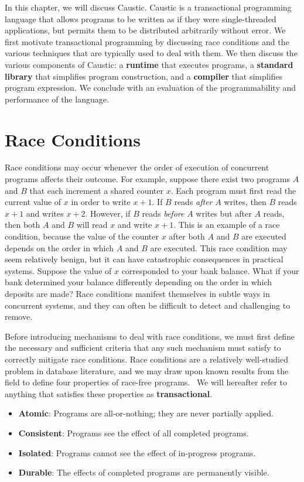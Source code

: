 \documentclass[../main.tex]{subfiles}
\begin{document}
In this chapter, we will discuss Caustic. Caustic is a transactional programming language that
allows programs to be written as if they were single-threaded applications, but permits them to be
distributed arbitrarily without error. We first motivate transactional programming by
discussing race conditions and the various techniques that are typically used to deal with them. We
then discuss the various components of Caustic: a \textbf{runtime} that executes programs, a
\textbf{standard library} that simplifies program construction, and a \textbf{compiler} that
simplifies program expression. We conclude with an evaluation of the programmability and
performance of the language.

\section{Race Conditions}
Race conditions may occur whenever the order of execution of concurrent programs affects their
outcome. For example, suppose there exist two programs $A$ and $B$ that each increment a shared
counter $x$. Each program must first read the current value of $x$ in order to write $x + 1$. If
$B$ reads \emph{after} $A$ writes, then $B$ reads $x + 1$ and writes $x + 2$. However, if $B$ reads
\emph{before} $A$ writes but after $A$ reads, then both $A$ and $B$ will read $x$ and write $x + 1$.
This is an example of a race condition, because the value of the counter $x$ after both $A$ and $B$
are executed depends on the order in which $A$ and $B$ are executed. This race condition may seem
relatively benign, but it can have catastrophic consequences in practical systems. Suppose the value
of $x$ corresponded to your bank balance. What if your bank determined your balance differently
depending on the order in which deposits are made? Race conditions manifest themselves in subtle
ways in concurrent systems, and they can often be difficult to detect and challenging to remove.

Before introducing mechanisms to deal with race conditions, we must first define the necessary and
sufficient criteria that any such mechanism must satisfy to correctly mitigate race conditions.
Race conditions are a relatively well-studied problem in database literature, and we may draw upon
known results from the field to define four properties of race-free programs.~\cite{transactions}
We will hereafter refer to anything that satisfies these properties as \textbf{transactional}.

\begin{itemize}
  \item \textbf{Atomic}: Programs are all-or-nothing; they are never partially applied.
  \item \textbf{Consistent}: Programs see the effect of all completed programs.
  \item \textbf{Isolated}: Programs cannot see the effect of in-progress programs.
  \item \textbf{Durable}: The effects of completed programs are permanently visible.
\end{itemize}
\end{document}
